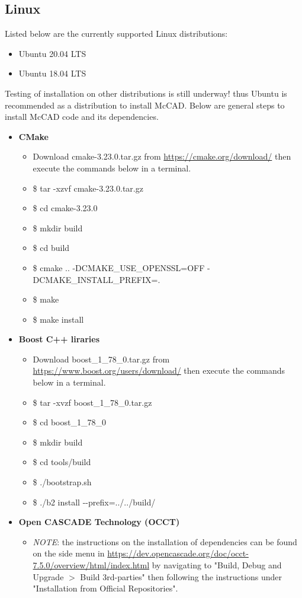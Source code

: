 \documentclass[letterpaper, 10 pt]{report}
\begin{document}
  \subsection{Linux}
  Listed below are the currently supported Linux distributions:
  \begin{itemize}
  	\item Ubuntu 20.04 LTS
  	\item Ubuntu 18.04 LTS
  \end{itemize} 
  Testing of installation on other distributions is still underway! thus Ubuntu is recommended as a distribution to install McCAD. Below are general steps to install McCAD code and its dependencies.
  \begin{itemize}
  	\item \textbf{CMake}
  	\begin{itemize}
  		\item Download cmake-3.23.0.tar.gz from \url{https://cmake.org/download/} then execute the commands below in a terminal.
  		\item \$ tar -xzvf cmake-3.23.0.tar.gz
  		\item \$ cd cmake-3.23.0
  		\item \$ mkdir build
  		\item \$ cd build
  		\item \$ cmake .. -DCMAKE\_USE\_OPENSSL=OFF -DCMAKE\_INSTALL\_PREFIX=.
  		\item \$ make
  		\item \$ make install
  	\end{itemize}
    \item \textbf{Boost C++ liraries}
    \begin{itemize}
    	\item Download boost\_1\_78\_0.tar.gz from \url{https://www.boost.org/users/download/} then execute the commands below in a terminal.
    	\item \$ tar -xvzf boost\_1\_78\_0.tar.gz
    	\item \$ cd boost\_1\_78\_0
    	\item \$ mkdir build
    	\item \$ cd tools/build
    	\item \$ ./bootstrap.sh
    	\item \$ ./b2 install -\--prefix=../../build/
    \end{itemize}
    \item \textbf{Open CASCADE Technology (OCCT)}
    \begin{itemize}
        \item \emph{NOTE}: the instructions on the installation of dependencies can be found on the side menu in \url{https://dev.opencascade.org/doc/occt-7.5.0/overview/html/index.html} by navigating to "Build, Debug and Upgrade $>$ Build 3rd-parties" then following the instructions under "Installation from Official Repositories".

\end{itemize}
\end{itemize}
\end{document}
